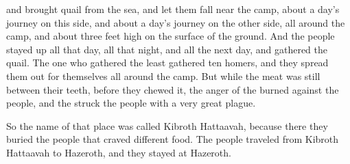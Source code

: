 {{}
and brought
quail
from
the sea,
and let them fall
near the camp,
about
a day’s
journey
on
this side, and about
a day’s journey
on the other side, all around
the camp,
and about
three feet
high on
the surface of
the ground.
And the people
stayed up
all
that day,
all
that night,
and all
the next
day,
and gathered
the quail.
The one who gathered
the least gathered
ten
homers,
and they spread
them out
for themselves all around
the camp.
But while the meat
was still
between
their teeth,
before
they chewed
it, the anger
of the {}
burned
against the people,
and the
{}
struck
the people
with a very
great
plague.
\par }{\PP {}So
the name
of that place
was
called
Kibroth Hattaavah,
because
there
they buried
the people
that craved different food.
The people
traveled
from Kibroth Hattaavah
to Hazeroth,
and they stayed at Hazeroth.


}
